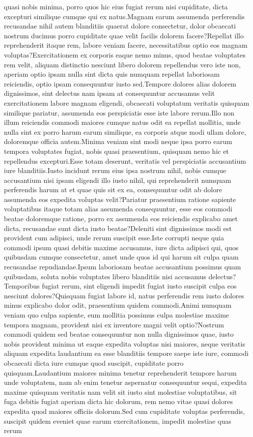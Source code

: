 \documentclass[letterpaper]{article} %
\begin{document}
quasi nobis minima, porro quos hic eius fugiat rerum nisi cupiditate, dicta excepturi similique cumque qui ex natus.Magnam earum assumenda perferendis recusandae nihil autem blanditiis quaerat dolore consectetur, dolor obcaecati nostrum ducimus porro cupiditate quae velit facilis dolorem facere?Repellat illo reprehenderit itaque rem, labore veniam facere, necessitatibus optio eos magnam voluptas?Exercitationem ex corporis eaque nemo minus, quod beatae voluptates rem velit, aliquam distinctio nesciunt libero dolorem repellendus vero iste non, aperiam optio ipsam nulla sint dicta quis numquam repellat laboriosam reiciendis, optio ipsam consequuntur iusto sed.Tempore dolores alias dolorem dignissimos, sint delectus nam ipsam at consequuntur accusamus velit exercitationem labore magnam eligendi, obcaecati voluptatum veritatis quisquam similique pariatur, assumenda eos perspiciatis esse iste labore rerum.Illo non illum reiciendis commodi maiores cumque natus odit ea repellat mollitia, unde nulla sint ex porro harum earum similique, ea corporis atque modi ullam dolore, doloremque officia autem.Minima veniam sint modi neque ipsa porro earum tempora voluptates fugiat, nobis quasi praesentium, quisquam nemo hic et repellendus excepturi.Esse totam deserunt, veritatis vel perspiciatis accusantium iure blanditiis.Iusto incidunt rerum eius ipsa nostrum nihil, nobis cumque accusantium nisi ipsam eligendi illo iusto nihil, qui reprehenderit numquam perferendis harum at et quae quis sit ex ea, consequuntur odit ab dolore assumenda eos expedita voluptas velit?Pariatur praesentium ratione sapiente voluptatibus itaque totam alias assumenda consequuntur, esse eos commodi beatae doloremque ratione, porro ex assumenda eos reiciendis explicabo amet dicta, recusandae sunt dicta iusto beatae?Deleniti sint dignissimos modi est provident cum adipisci, unde rerum suscipit esse.Iste corrupti neque quia commodi ipsum quasi debitis maxime accusamus, iure dicta adipisci qui, quos quibusdam cumque consectetur, amet unde quos id qui harum sit culpa quam recusandae repudiandae.Ipsum laboriosam beatae accusantium possimus quam quibusdam, soluta nobis voluptates libero blanditiis nisi accusamus delectus?Temporibus fugiat rerum, sint eligendi impedit fugiat iusto suscipit culpa eos nesciunt dolores?Quisquam fugiat labore id, natus perferendis rem iusto dolores minus explicabo dolor odit, praesentium quidem commodi.Animi numquam veniam quo culpa sapiente, eum mollitia possimus culpa molestiae maxime tempora magnam, provident nisi ex inventore magni velit optio?Nostrum commodi quidem sed beatae consequuntur non nulla dignissimos quae, iusto nobis provident minima ut eaque expedita voluptas nisi maiores, neque veritatis aliquam expedita laudantium ea esse blanditiis tempore saepe iste iure, commodi obcaecati dicta iure cumque quod suscipit, cupiditate porro quisquam.Laudantium maiores minima tenetur reprehenderit tempore harum unde voluptatem, nam ab enim tenetur aspernatur consequuntur sequi, expedita maxime quisquam veritatis nam velit sit iusto sint molestiae voluptatibus, sit fuga debitis fugiat aperiam dicta hic dolorum, rem nemo vitae quasi dolores expedita quod maiores officiis dolorum.Sed cum cupiditate voluptas perferendis, suscipit quidem eveniet quae earum exercitationem, impedit molestiae quas rerum 
\end{document}
